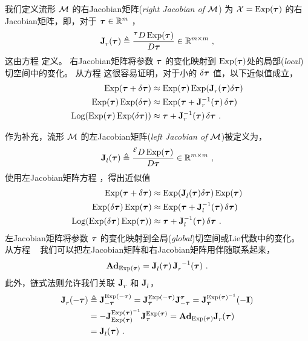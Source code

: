 我们定义流形 $\cM$ 的右Jacobian矩阵(\emph{right Jacobian of $\cM$}) 为 $\cX=\Exp(\bftau)$ 的右Jacobian矩阵，即，对于 $\bftau\in
\bbR^m$ ，
%
\begin{align}
\mjac{}{r}(\bftau) \te \rdpar{\Exp(\bftau)}{\bftau} \in \bbR^{m\times m} 
~,
\label{equ:M_Jr}
\end{align}
%
这由方程  定义。 
右Jacobian矩阵将参数 $\bftau$ 的变化映射到 $\Exp(\bftau)$处的局部(\emph{local})切空间中的变化。
从方程  这很容易证明，对于小的 $\delta\bftau$ 值，以下近似值成立，
%
\begin{align}
\Exp(\bftau+\delta\bftau) &\approx \Exp(\bftau)\Exp(\mjac{}{r}(\bftau)\delta\bftau) \label{equ:Jr_1} \\
\Exp(\bftau)\Exp(\delta\bftau) &\approx \Exp(\bftau+\mjac{-1}{r}(\bftau)\,\delta\bftau) \label{equ:Jr_2} \\
\Log(\Exp(\bftau)\Exp(\delta\bftau)) &\approx \bftau+\mjac{-1}{r}(\bftau)\,\delta\bftau \label{equ:Jr_3}
~.
\end{align}
%

作为补充，流形 $\cM$ 的左Jacobian矩阵(\emph{left Jacobian of $\cM$})被定义为，
%
\begin{align}
\mjac{}{l}(\bftau) \te \ldpar{\Exp(\bftau)}{\bftau} \in \bbR^{m\times m} 
~,
\label{equ:M_Jl}
\end{align}
%
使用左Jacobian矩阵方程 ，得出近似值
%
\begin{align}
\Exp(\bftau+\delta\bftau) &\approx \Exp(\mjac{}{l}(\bftau)\delta\bftau)\Exp(\bftau) \label{equ:Jl_1}\\
\Exp(\delta\bftau)\Exp(\bftau) &\approx \Exp(\bftau+\mjac{-1}{l}(\bftau)\,\delta\bftau) \label{equ:Jl_2}\\
\Log(\Exp(\delta\bftau)\Exp(\bftau)) &\approx \bftau+\mjac{-1}{l}(\bftau)\,\delta\bftau \label{equ:Jl_3}
~.
\end{align}
% 
左Jacobian矩阵将参数 $\bftau$ 的变化映射到全局(\emph{global})切空间或Lie代数中的变化。
从方程 ~ 我们可以把左Jacobian矩阵和右Jacobian矩阵用伴随联系起来，
%
\begin{align}\label{equ:Jr_Jl_Adj}
\Ad[\cM]{\Exp(\bftau)} = \mjac{}{l}(\bftau)\,\mjac{}{r}\inv(\bftau)
~.
\end{align}
%
此外，链式法则允许我们关联 $\mjac{}{r}$ 和 $\mjac{}{l}$，
%
\begin{align}\label{equ:Jr_minus}
\mjac{}{r}(-\bftau) 
 &\te \mjac{\Exp(-\bftau)}{-\bftau} 
 = \mjac{\Exp(-\bftau)}{\bftau}\mjac{\bftau}{-\bftau} 
 = \mjac{\Exp(\bftau)\inv}{\bftau}(-\bfI) 
 \notag\\
 &
 = -\mjac{\Exp(\bftau)\inv}{\Exp(\bftau)}\mjac{\Exp(\bftau)}{\bftau} 
 = \Ad{\Exp(\bftau)}\mjac{}{r}(\bftau)
 \notag\\
 &
 = \mjac{}{l}(\bftau)
 ~.
\end{align}



